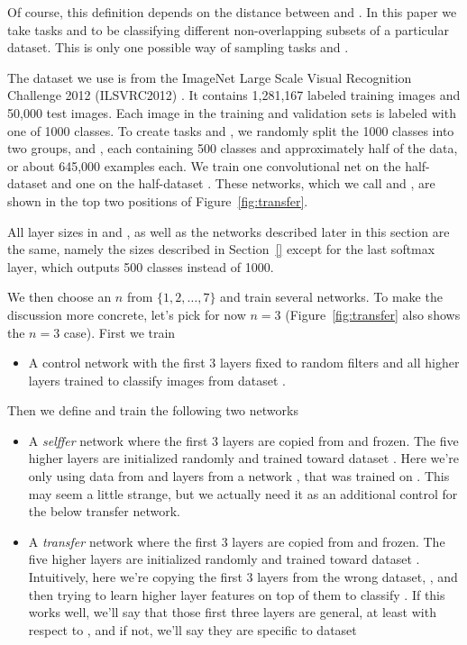 Of course, this definition depends on the distance between \dA and \dB. In this paper we take tasks \dA and \dB to be classifying different non-overlapping subsets of a particular dataset.   This is only one possible way of sampling tasks \dA and \dB.

The dataset we use is from the ImageNet Large Scale Visual Recognition Challenge 2012 (ILSVRC2012) \citep{imagenet_cvpr09}. It contains 1,281,167 labeled training images and 50,000 test images. Each image in the training and validation sets is labeled with one of 1000 classes.
To create tasks \dA and \dB, we randomly split the 1000 classes into two groups, \dA and \dB, each containing 500 classes and approximately half of the data, or about 645,000 examples each. We train one convolutional net on the half-dataset \dA and one on the half-dataset \dB. These networks, which we call  and , are shown in the top two positions of Figure~\ref{fig:transfer}.

All layer sizes in  and , as well as the networks described later in this section are the same, namely the sizes described in Section~\ref{} except for the last softmax layer, which outputs 500 classes instead of 1000.


We then choose an $n$ from $\{1, 2, \ldots, 7\}$ and train several networks. To make the discussion more concrete, let's pick for now $n=3$ (Figure~\ref{fig:transfer} also shows the $n=3$ case). First we train 

\begin{itemize}
\item A control network  with the first $3$ layers fixed to random filters and all higher layers trained to classify images from dataset \dB.
\end{itemize}

Then we define and train the following two networks

\begin{itemize}
\item A \emph{selffer} network  where the first $3$ layers are copied from  and frozen. The five higher layers are initialized randomly and trained toward dataset \dB. Here we're only using data from \dB and layers from a network , that was trained on \dB. This may seem a little strange, but we actually need it as an additional control for the below transfer network.

\item A \emph{transfer} network  where the first $3$ layers are copied from  and frozen. The five higher layers are initialized randomly and trained toward dataset \dB. Intuitively, here we're copying the first $3$ layers from the wrong dataset, \dA,  and then trying to learn higher layer features on top of them to classify \dB. If this works well, we'll say that those first three layers are general, at least with respect to \dB, and if not, we'll say they are specific to dataset \dA
\end{itemize}

